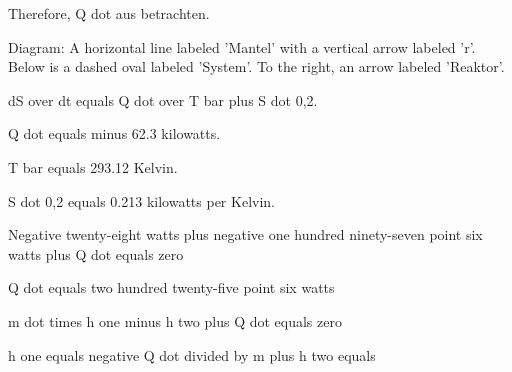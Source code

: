 Therefore, Q dot aus betrachten.

Diagram: A horizontal line labeled 'Mantel' with a vertical arrow labeled 'r'. Below is a dashed oval labeled 'System'. To the right, an arrow labeled 'Reaktor'.

dS over dt equals Q dot over T bar plus S dot 0,2.

Q dot equals minus 62.3 kilowatts.

T bar equals 293.12 Kelvin.

S dot 0,2 equals 0.213 kilowatts per Kelvin.

Negative twenty-eight watts plus negative one hundred ninety-seven point six watts plus Q dot equals zero

Q dot equals two hundred twenty-five point six watts

m dot times h one minus h two plus Q dot equals zero

h one equals negative Q dot divided by m plus h two equals